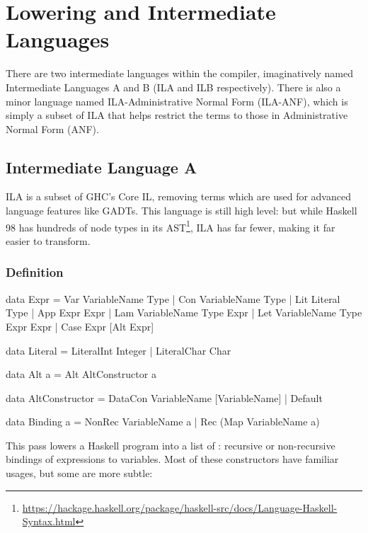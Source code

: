 \documentclass[dissertation.tex]{subfiles}
\begin{document}
\section{Lowering and Intermediate Languages}
{
    There are two intermediate languages within the compiler, imaginatively named Intermediate Languages A and B (ILA and ILB respectively). There is also a minor language named ILA-Administrative Normal Form (ILA-ANF), which is simply a subset of ILA that helps restrict the terms to those in Administrative Normal Form (ANF).

    \subsection{Intermediate Language A}
    {
        ILA is a subset of GHC's Core IL, removing terms which are used for advanced language features like GADTs. This language is still high level: but while Haskell 98 has hundreds of node types in its AST\footnote{\url{https://hackage.haskell.org/package/haskell-src/docs/Language-Haskell-Syntax.html}}, ILA has far fewer, making it far easier to transform.

        \subsubsection{Definition}
        {
            \begin{haskellfigure}
            data Expr = Var VariableName Type
                      | Con VariableName Type
                      | Lit Literal Type
                      | App Expr Expr
                      | Lam VariableName Type Expr
                      | Let VariableName Type Expr Expr
                      | Case Expr [Alt Expr]

            data Literal = LiteralInt Integer
                         | LiteralChar Char

            data Alt a = Alt AltConstructor a

            data AltConstructor = DataCon VariableName [VariableName]
                                | Default

            data Binding a = NonRec VariableName a
                           | Rec (Map VariableName a)
            \end{haskellfigure}

            This pass lowers a Haskell program into a list of : recursive or non-recursive bindings of expressions to variables. Most of these constructors have familiar usages, but some are more subtle:

}}}
\end{document}
